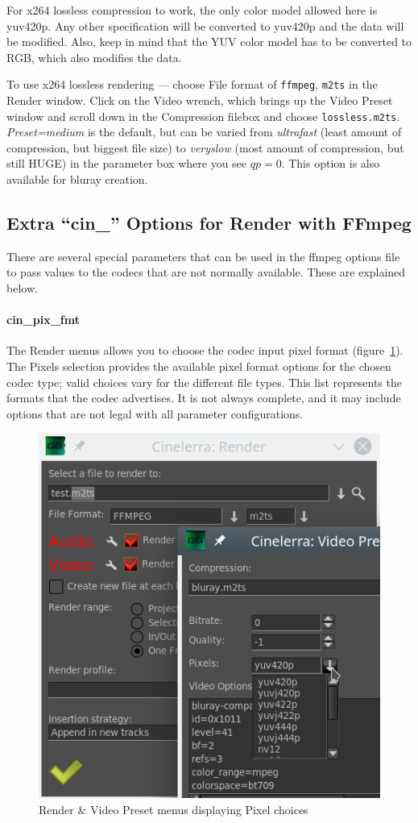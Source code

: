 For x264 lossless compression to work, the only color model allowed here is yuv420p.  Any other specification will be converted to yuv420p and the data will be modified.  Also, keep in mind that the YUV color model has to be converted to RGB, which also modifies the data.

To use x264 lossless rendering --- choose File format of \texttt{ffmpeg}, \texttt{m2ts} in the Render window.  Click on the Video wrench, which brings up the Video Preset window and scroll down in the Compression filebox and choose \texttt{lossless.m2ts}.  \textit{Preset=medium} is the default, but can be varied from \textit{ultrafast} (least amount of compression, but biggest file size) to \textit{veryslow} (most amount of compression, but still HUGE) in the parameter box where you see $qp=0$.  This option is also available for bluray creation.

\subsection{Extra “cin\_” Options for Render with FFmpeg}%
\label{sub:extra_cin_option_ffmpeg}

There are several special parameters that can be used in the ffmpeg options file to pass values to the codecs that are not normally available.  These are explained below.

\paragraph{cin\_pix\_fmt} The Render menus allows you to choose the codec input pixel format (figure~\ref{fig:yuv420}).  The Pixels selection provides the available pixel format options for the chosen codec type; valid choices vary for the different file types.  This list represents the formats that the codec advertises.  It is not always complete, and it may include options that are not legal with all parameter configurations.

\begin{figure}[htpb]
    \centering
    \includegraphics[width=0.6\linewidth]{images/yuv420.png}
    \caption{Render \& Video Preset menus displaying Pixel choices}
    \label{fig:yuv420}
\end{figure}

